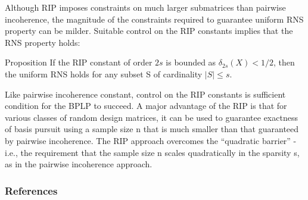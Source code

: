 \documentclass[10pt,handout,english]{beamer}
\begin{document}
\begin{frame}[allowframebreaks]
\begin{definition}
\end{definition}

Although RIP imposes constraints on much larger submatrices than pairwise incoherence, the magnitude of the constraints required to guarantee uniform RNS property can be milder. Suitable control on the RIP constants implies that the RNS property holds:

\begin{block}{Proposition}
If the RIP constant of order $2s$ is bounded as $\delta_{2s}(X)<1/2$, then the uniform RNS holds for any subset S of cardinality $\lvert S\rvert\leq s$.
\end{block}

Like pairwise incoherence constant, control on the RIP constants is sufficient condition for the BPLP to succeed. A major advantage of the RIP is that for various classes of random design matrices, it can be used to guarantee exactness of basis pursuit using a sample size n that is much smaller than that guaranteed by pairwise incoherence. The RIP approach overcomes the “quadratic barrier” - i.e., the requirement that the sample size n scales quadratically in the sparsity s, as in the pairwise incoherence approach.
\end{frame}

\begin{frame}[allowframebreaks]
\frametitle{References}


\end{frame}
\end{document}
